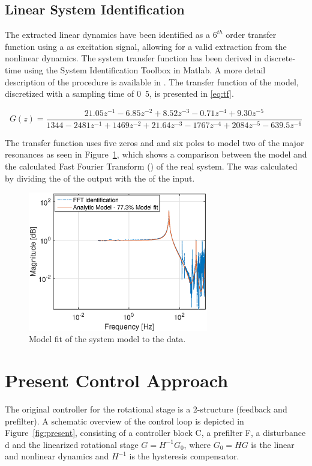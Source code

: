 \subsection{Linear System Identification}
\label{sec:linsys}
The extracted linear dynamics have been identified as a $6^{th}$ order transfer function using a \abbrPRBS as excitation signal, allowing for a valid extraction from the nonlinear dynamics. The system transfer function has been derived in discrete-time using the System Identification Toolbox in Matlab. A more detail description of the procedure is available in \citep{ButcherController:2015}. The transfer function of the model, discretized with a sampling time of \unit{0.5}{\milli\second}, is presented in \eqref{eq:tf}.

\begin{equation}
  \label{eq:tf}
  G(z) = \frac{21.05z^{-1} - 6.85z^{-2} + 8.52z^{-3} - 0.71z^{-4} + 9.30z^{-5}}{1344 - 2481z^{-1} + 1469z^{-2} + 21.64z^{-3} - 1767z^{-4} + 2084z^{-5} - 639.5z^{-6}}
\end{equation}

The transfer function uses five zeros and and six poles to model two of the major resonances as seen in Figure~\ref{fig:model}, which shows a comparison between the model and the calculated Fast Fourier Transform (\abbrFFT) of the real system. The \abbrFFT was calculated by dividing the \abbrFFT of the output with the \abbrFFT of the input.

\begin{figure}[h!]
  \centering
  \includegraphics[width=0.7\textwidth]{fig/matlab/model.eps}
  \caption{\label{fig:model} Model fit of the system model to the \abbrFFT data.}
\end{figure}

\FloatBarrier
\section{Present Control Approach}\label{sec:presentControlApproach}
The original controller for the rotational stage is a 2-\abbrDOF structure (feedback and prefilter). A schematic overview of the control loop is depicted in Figure~\ref{fig:present}, consisting of a controller block C, a prefilter F, a disturbance d and the linearized rotational stage $G = H^{-1}G_0$, where $G_0 = HG$ is the linear and nonlinear dynamics and $H^{-1}$ is the hysteresis compensator.

